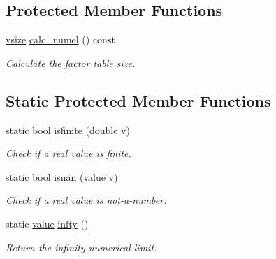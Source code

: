 \subsection*{Protected Member Functions}
\begin{DoxyCompactItemize}
\item 
\hyperlink{classmerlin_1_1factor_a31de8d8d0c43cc33dc3874408e75b0fc}{vsize} \hyperlink{classmerlin_1_1factor_abf5be29f8457f2f30d2c8d305cbbf193}{calc\+\_\+numel} () const 
\begin{DoxyCompactList}\small\item\em Calculate the factor table size. \end{DoxyCompactList}\end{DoxyCompactItemize}
\subsection*{Static Protected Member Functions}
\begin{DoxyCompactItemize}
\item 
\hypertarget{classmerlin_1_1factor_ae4504c8e1fa22705efcbf6ffd077575d}{}static bool \hyperlink{classmerlin_1_1factor_ae4504c8e1fa22705efcbf6ffd077575d}{isfinite} (double v)\label{classmerlin_1_1factor_ae4504c8e1fa22705efcbf6ffd077575d}

\begin{DoxyCompactList}\small\item\em Check if a real value is finite. \end{DoxyCompactList}\item 
\hypertarget{classmerlin_1_1factor_a2a705124978c870c0233956610ff9f89}{}static bool \hyperlink{classmerlin_1_1factor_a2a705124978c870c0233956610ff9f89}{isnan} (\hyperlink{classmerlin_1_1factor_a1b14d19e509403448fbef26b003c9281}{value} v)\label{classmerlin_1_1factor_a2a705124978c870c0233956610ff9f89}

\begin{DoxyCompactList}\small\item\em Check if a real value is not-\/a-\/number. \end{DoxyCompactList}\item 
\hypertarget{classmerlin_1_1factor_a3f88d157c50bf2bb65dc04c535f4e344}{}static \hyperlink{classmerlin_1_1factor_a1b14d19e509403448fbef26b003c9281}{value} \hyperlink{classmerlin_1_1factor_a3f88d157c50bf2bb65dc04c535f4e344}{infty} ()\label{classmerlin_1_1factor_a3f88d157c50bf2bb65dc04c535f4e344}

\begin{DoxyCompactList}\small\item\em Return the infinity numerical limit. \end{DoxyCompactList}\end{DoxyCompactItemize}
